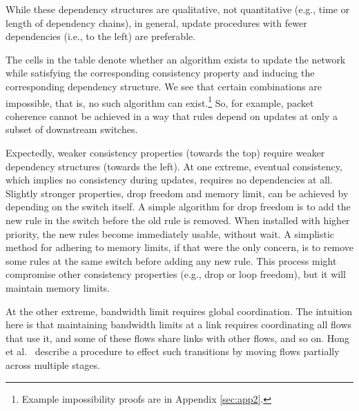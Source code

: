 While these dependency structures are qualitative, not quantitative (e.g., time or length of dependency chains), in general, update procedures with fewer dependencies (i.e., to the left) are preferable.


The cells in the table denote whether an algorithm exists to update the network while satisfying the corresponding consistency property and inducing the corresponding dependency structure. We see that certain combinations are impossible, that is, no such algorithm can exist.\footnote{Example impossibility proofs are in Appendix \ref{sec:app2}.} So, for example, packet coherence cannot be achieved in a way that rules depend on updates at only a subset of downstream switches.

Expectedly, weaker consistency properties (towards the top) require weaker dependency structures (towards the left). At one extreme, eventual consistency, which implies no consistency during updates, requires no dependencies at all.  Slightly stronger properties, drop freedom and memory limit, can be achieved by depending on the switch itself. A simple algorithm for drop freedom is to add the new rule in the switch before the old rule is removed. When installed with higher priority, the new rules become immediately usable, without wait. 
A simplistic method for adhering to memory limits, if that were the only concern, is to remove some rules at the same switch before adding any new rule. This process might compromise other consistency properties (e.g., drop or loop freedom), but it will maintain memory limits.

At the other extreme, bandwidth limit requires global coordination. The intuition here is that maintaining bandwidth limits at a link requires coordinating all flows that use it, and some of these flows share links with other flows, and so on. Hong et al.~\cite{swan} describe a procedure to effect such transitions by moving flows partially across multiple stages.

